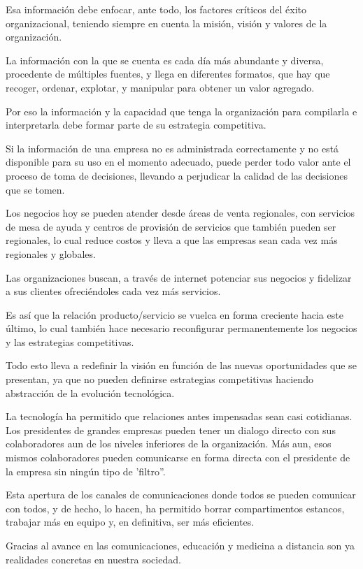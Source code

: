 \documentclass[a4paper, 12pt]{article}
\begin{document}
Esa información debe enfocar, ante todo, los factores críticos del éxito organizacional, teniendo siempre en cuenta la misión, visión y valores de la organización.

La información con la que se cuenta es cada día más abundante y diversa, procedente de múltiples fuentes, y llega en diferentes formatos, que hay que recoger, ordenar, explotar, y manipular para obtener un valor agregado.

Por eso la información y la capacidad que tenga la organización para compilarla e interpretarla debe formar parte de su estrategia competitiva.

Si la información de una empresa no es administrada correctamente y no está disponible para su uso en el momento adecuado, puede perder todo valor ante el proceso de toma de decisiones, llevando a perjudicar la calidad de las decisiones que se tomen.

Los negocios hoy se pueden atender desde áreas de venta regionales, con servicios de mesa de ayuda y centros de provisión de servicios que también pueden ser regionales, lo cual reduce costos y lleva a que las empresas sean cada vez más regionales y globales.

Las organizaciones buscan, a través de internet potenciar sus negocios y fidelizar a sus clientes ofreciéndoles cada vez más servicios.

Es así que la relación producto/servicio se vuelca en forma creciente hacia este último, lo cual también hace necesario reconfigurar permanentemente los negocios y las estrategias competitivas.

Todo esto lleva a redefinir la visión en función de las nuevas oportunidades que se presentan, ya que no pueden definirse estrategias competitivas haciendo abstracción de la evolución tecnológica.

La tecnología ha permitido que relaciones antes impensadas sean casi cotidianas. Los presidentes de grandes empresas pueden tener un dialogo directo con sus colaboradores aun de los niveles inferiores de la organización. Más aun, esos mismos colaboradores pueden comunicarse en forma directa con el presidente de la empresa sin ningún tipo de 'filtro''.

Esta apertura de los canales de comunicaciones donde todos se pueden comunicar con todos, y de hecho, lo hacen, ha permitido borrar compartimentos estancos, trabajar más en equipo y, en definitiva, ser más eficientes.

Gracias al avance en las comunicaciones, educación y medicina a distancia son ya realidades concretas en nuestra sociedad.
\end{document}
